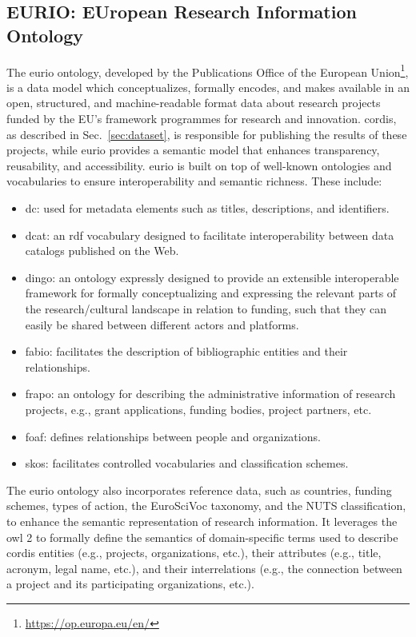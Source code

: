 \subsection*{EURIO: EUropean Research Information Ontology}
The \gls{eurio} ontology, developed by the Publications Office of the European Union\footnote{\url{https://op.europa.eu/en/}}, is a data model which conceptualizes, formally encodes, and makes available in an open, structured, and machine-readable format data about research projects funded by the EU's framework programmes for research and innovation.
\gls{cordis}, as described in Sec.~\ref{sec:dataset}, is responsible for publishing the results of these projects, while \gls{eurio} provides a semantic model that enhances transparency, reusability, and accessibility.
\gls{eurio} is built on top of well-known ontologies and vocabularies to ensure interoperability and semantic richness.
These include:
\begin{itemize}
    \item \gls{dc}: used for metadata elements such as titles, descriptions, and identifiers.
    \item \gls{dcat}: an \gls{rdf} vocabulary designed to facilitate interoperability between data catalogs published on the Web.
    \item \gls{dingo}: an ontology expressly designed to provide an extensible interoperable framework for formally conceptualizing and expressing the relevant parts of the research/cultural landscape in relation to funding, such that they can easily be shared between different actors and platforms.
    \item \gls{fabio}: facilitates the description of bibliographic entities and their relationships.
    \item \gls{frapo}: an ontology for describing the administrative information of research projects, e.g., grant applications, funding bodies, project partners, etc.
    \item \gls{foaf}: defines relationships between people and organizations.
    \item \gls{skos}: facilitates controlled vocabularies and classification schemes.
\end{itemize}

The \gls{eurio} ontology also incorporates reference data, such as countries, funding schemes, types of action, the EuroSciVoc taxonomy, and the NUTS classification, to enhance the semantic representation of research information.
It leverages the \gls{owl} 2 to formally define the semantics of domain-specific terms used to describe \gls{cordis} entities (e.g., projects, organizations, etc.), their attributes (e.g., title, acronym, legal name, etc.), and their interrelations (e.g., the connection between a project and its participating organizations, etc.).

